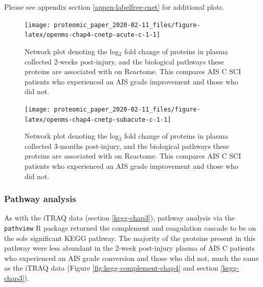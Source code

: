 \documentclass[9pt,lineno]{elife}
\begin{document}
Please see appendix section \ref{appen-labelfree-cnet} for additional plots.

\begin{landscape}



\begin{figure}

{\centering \texttt{[image: proteomic\_paper\_2020-02-11\_files/figure-latex/openms-chap4-cnetp-acute-c-1-1]} 

}

\caption{Network plot denoting the log\(_2\) fold change of proteins in plasma collected 2-weeks post-injury, and the biological pathways these proteins are associated with on Reactome. This compares AIS C SCI patients who experienced an AIS grade improvement and those who did not.}\label{fig:openms-chap4-cnetp-acute-c-1}
\end{figure}

\end{landscape}
\begin{landscape}



\begin{figure}

{\centering \texttt{[image: proteomic\_paper\_2020-02-11\_files/figure-latex/openms-chap4-cnetp-subacute-c-1-1]} 

}

\caption{Network plot denoting the log\(_2\) fold change of proteins in plasma collected 3-months post-injury, and the biological pathways these proteins are associated with on Reactome. This compares AIS C SCI patients who experienced an AIS grade improvement and those who did not.}\label{fig:openms-chap4-cnetp-subacute-c-1}
\end{figure}

\end{landscape}
\clearpage

\hypertarget{pathway-analysis}{%
\subsubsection{Pathway analysis}\label{pathway-analysis}}

As with the iTRAQ data (section \ref{kegg-chap3}), pathway analysis via the \texttt{pathview} R package returned the complement and coagulation cascade to be on the sole significant KEGG pathway.
The majority of the proteins present in this pathway were less abundant in the 2-week post-injury plasma of AIS C patients who experienced an AIS grade conversion and those who did not, much the same as the iTRAQ data (Figure \ref{fig:kegg-complement-chap4} and section \ref{kegg-chap3}).
\end{document}
